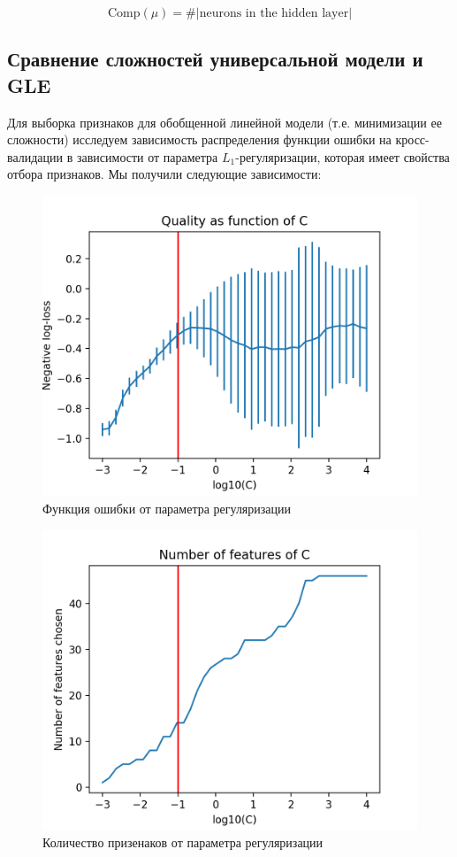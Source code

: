 \documentclass[12pt, fleqn, unicode]{article}
\begin{document}
$$
    \mathrm{Comp}(\mu) = \#|\text{neurons in the hidden layer}|
$$

\subsection{Сравнение сложностей универсальной модели и GLE}

Для выборка признаков для обобщенной линейной модели (т.е. минимизации ее сложности)
исследуем зависимость распределения функции ошибки на кросс-валидации в
зависимости от параметра $L_1$-регуляризации, которая имеет свойства
отбора признаков. Мы получили следующие зависимости:

\begin{figure}[ht]
    \caption{Функция ошибки от параметра регуляризации}
    \centering
      \includegraphics[width=\textwidth]{../pics/lr_quality_C.png}
\end{figure}

\begin{figure}[ht]
    \caption{Количество призенаков от параметра регуляризации}
    \centering
      \includegraphics[width=\textwidth]{../pics/lr_n_features_C.png}
\end{figure}
\end{document}
